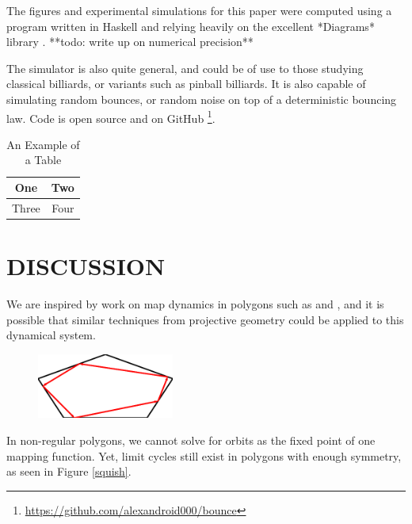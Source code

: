 \documentclass[letterpaper, 10 pt, conference]{ieeeconf}  %
\begin{document}
The figures and experimental simulations for this paper were computed using a
program written in Haskell and relying heavily on the excellent *Diagrams*
library \cite{diagrams}. **todo: write up on numerical precision**

The simulator is also quite general, and could be of use to those studying
classical billiards, or variants such as pinball billiards. It is also capable
of simulating random bounces, or random noise on top of a deterministic bouncing
law. Code is open source and on GitHub
\footnote{\url{https://github.com/alexandroid000/bounce}}.



\begin{table}[h]
\caption{An Example of a Table}
\label{table_example}
\begin{center}
\begin{tabular}{|c||c|}
\hline
One & Two\\
\hline
Three & Four\\
\hline
\end{tabular}
\end{center}
\end{table}



\section{DISCUSSION}

We are inspired by work on map dynamics in polygons such as
\cite{schwartz_billiards} and \cite{schwartz1992}, and it is possible that similar
techniques from projective geometry could be applied to this dynamical system.

\begin{figure}
\centering

\includegraphics[width=0.4\textwidth]{figs/squish.pdf}


\end{figure}


In non-regular polygons, we cannot solve for orbits as the fixed point of one
mapping function. Yet, limit cycles still exist in polygons with enough
symmetry, as seen in Figure \ref{squish}.
\end{document}

